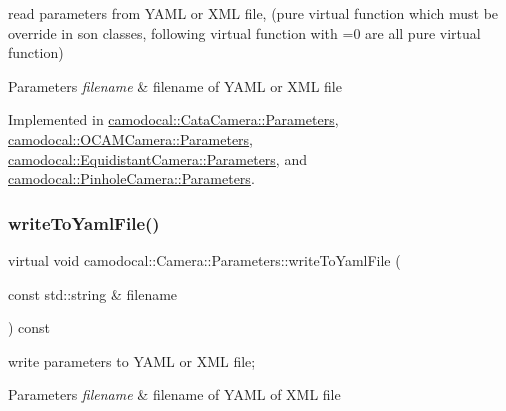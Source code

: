 read parameters from Y\+A\+ML or X\+ML file, (pure virtual function which must be override in son classes, following virtual function with \textquotesingle{}=0\textquotesingle{} are all pure virtual function) 


\begin{DoxyParams}{Parameters}
{\em filename} & filename of Y\+A\+ML or X\+ML file \\
\hline
\end{DoxyParams}


Implemented in \hyperlink{classcamodocal_1_1CataCamera_1_1Parameters_a756399dd928f1a0a9b0eb7922361939f}{camodocal\+::\+Cata\+Camera\+::\+Parameters}, \hyperlink{classcamodocal_1_1OCAMCamera_1_1Parameters_a4cf20a66d7f4e9daf84fec3a83a6c458}{camodocal\+::\+O\+C\+A\+M\+Camera\+::\+Parameters}, \hyperlink{classcamodocal_1_1EquidistantCamera_1_1Parameters_a66d75d7cc90bd65120ca10914b38b935}{camodocal\+::\+Equidistant\+Camera\+::\+Parameters}, and \hyperlink{classcamodocal_1_1PinholeCamera_1_1Parameters_a89d5834203e80ca6c09f60c47627c9a7}{camodocal\+::\+Pinhole\+Camera\+::\+Parameters}.

\mbox{\label{classcamodocal_1_1Camera_1_1Parameters_a7da3e505d5b047c7bfa3cf94d6c97710}} 
\subsubsection{\texorpdfstring{write\+To\+Yaml\+File()}{writeToYamlFile()}}
{\footnotesize\ttfamily virtual void camodocal\+::\+Camera\+::\+Parameters\+::write\+To\+Yaml\+File (\begin{DoxyParamCaption}\item[{const std\+::string \&}]{filename }\end{DoxyParamCaption}) const\hspace{0.3cm}{\ttfamily [pure virtual]}}



write parameters to Y\+A\+ML or X\+ML file; 


\begin{DoxyParams}{Parameters}
{\em filename} & filename of Y\+A\+ML of X\+ML file \\
\hline
\end{DoxyParams}


